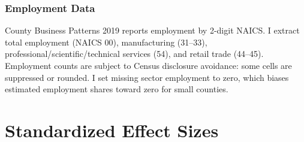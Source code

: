 \documentclass[12pt]{article}
\begin{document}
\subsubsection*{Employment Data} County Business Patterns 2019 reports employment by 2-digit NAICS. I extract total employment (NAICS 00), manufacturing (31--33), professional/scientific/technical services (54), and retail trade (44--45). Employment counts are subject to Census disclosure avoidance: some cells are suppressed or rounded. I set missing sector employment to zero, which biases estimated employment shares toward zero for small counties.

\section{Standardized Effect Sizes}
\label{sec:sde}


\end{document}
